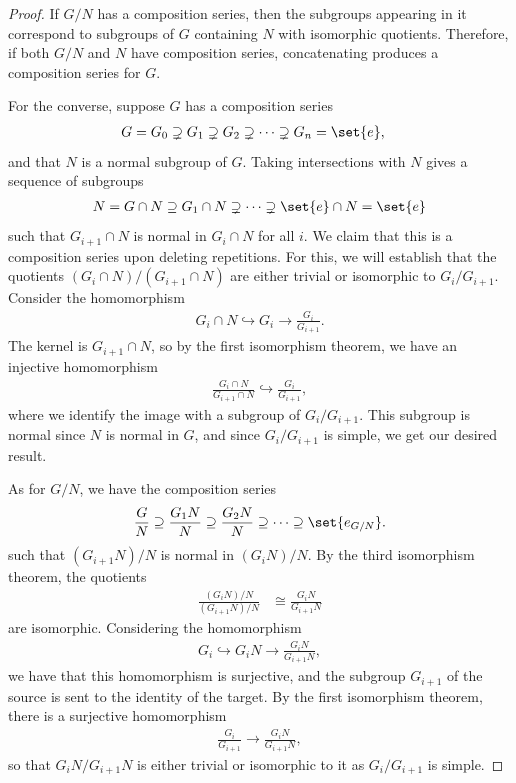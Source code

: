 \documentclass[10pt]{mypackage}
\begin{document}
\begin{proof}
  If $G/N$ has a composition series, then the subgroups appearing in it correspond to subgroups of $G$ containing $N$ with isomorphic quotients. Therefore, if both $G/N$ and $N$ have composition series, concatenating produces a composition series for $G$.

  For the converse, suppose $G$ has a composition series
  \begin{align*}
    G &= G_0\supsetneq G_1\supsetneq G_2\supsetneq \cdots \supsetneq G_n = \set{e},
  \end{align*}
  and that $N$ is a normal subgroup of $G$. Taking intersections with $N$ gives a sequence of subgroups
  \begin{align*}
    N = G\cap N \supseteq G_1\cap N \supsetneq \cdots \supsetneq \set{e}\cap N = \set{e}
  \end{align*}
  such that $G_{i+1}\cap N$ is normal in $G_i\cap N$ for all $i$. We claim that this is a composition series upon deleting repetitions. For this, we will establish that the quotients $\left( G_{i}\cap N \right)/\left( G_{i+1}\cap N \right)$ are either trivial or isomorphic to $G_i/G_{i+1}$. Consider the homomorphism
  \begin{align*}
    G_i\cap N \hookrightarrow G_i\rightarrow \frac{G_i}{G_{i+1}}.
  \end{align*}
  The kernel is $G_{i+1}\cap N$, so by the first isomorphism theorem, we have an injective homomorphism
  \begin{align*}
    \frac{G_{i}\cap N}{G_{i+1}\cap N} \hookrightarrow \frac{G_i}{G_{i+1}},
  \end{align*}
  where we identify the image with a subgroup of $G_i/G_{i+1}$. This subgroup is normal since $N$ is normal in $G$, and since $G_i/G_{i+1}$ is simple, we get our desired result.

  As for $G/N$, we have the composition series
  \begin{align*}
    \frac{G}{N} \supseteq \frac{G_1N}{N} \supseteq \frac{G_2N}{N}\supseteq\cdots \supseteq \set{e_{G/N}}.
  \end{align*}
  such that $\left( G_{i+1}N \right)/N$ is normal in $\left( G_iN \right)/N$. By the third isomorphism theorem, the quotients
  \begin{align*}
    \frac{\left( G_{i}N \right)/N}{\left( G_{i+1}N \right)/N} &\cong \frac{G_iN}{G_{i+1}N}
  \end{align*}
  are isomorphic. Considering the homomorphism 
  \begin{align*}
    G_i\hookrightarrow G_{i}N \rightarrow\frac{G_iN}{G_{i+1}N},
  \end{align*}
  we have that this homomorphism is surjective, and the subgroup $G_{i+1}$ of the source is sent to the identity of the target. By the first isomorphism theorem, there is a surjective homomorphism
  \begin{align*}
    \frac{G_{i}}{G_{i+1}} \rightarrow \frac{G_iN}{G_{i+1}N},
  \end{align*}
  so that $G_iN/G_{i+1}N$ is either trivial or isomorphic to it as $G_i/G_{i+1}$ is simple.
\end{proof}
\end{document}
